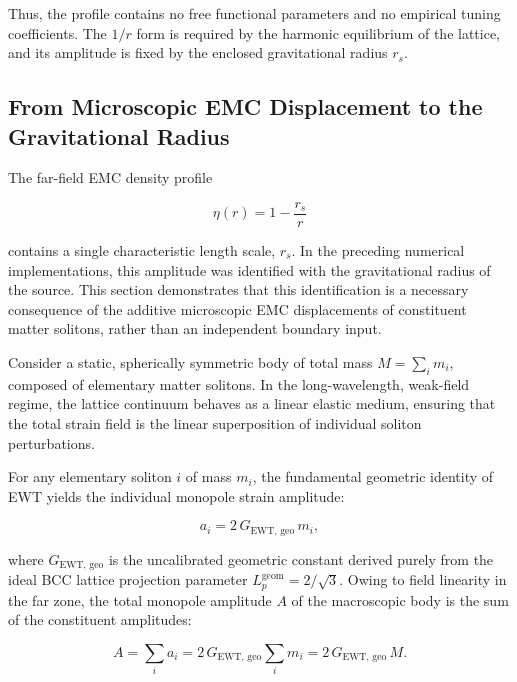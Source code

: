 \documentclass[10pt,a4paper]{article}
\begin{document}
Thus, the profile contains no free functional parameters and no empirical
tuning coefficients. The \(1/r\) form is required by the harmonic
equilibrium of the lattice, and its amplitude is fixed by the enclosed
gravitational radius \(r_s\).

\subsection{From Microscopic EMC Displacement to the Gravitational Radius}
\label{sec:micro_to_gravitational_radius}

The far-field EMC density profile

\begin{equation}
	\eta(r) = 1 - \frac{r_s}{r}
\end{equation}

contains a single characteristic length scale, \(r_s\). In the preceding numerical implementations, this amplitude was identified with the gravitational radius of the source. This section demonstrates that this identification is a necessary consequence of the additive microscopic EMC displacements of constituent matter solitons, rather than an independent boundary input.

Consider a static, spherically symmetric body of total mass \(M = \sum_i m_i\), composed of elementary matter solitons. In the long-wavelength, weak-field regime, the lattice continuum behaves as a linear elastic medium, ensuring that the total strain field is the linear superposition of individual soliton perturbations.

For any elementary soliton \(i\) of mass \(m_i\), the fundamental geometric identity of EWT yields the individual monopole strain amplitude:

\begin{equation}
	a_i = 2\,G_{\text{EWT, geo}}\,m_i ,
\end{equation}

where \(G_{\text{EWT, geo}}\) is the uncalibrated geometric constant derived purely from the ideal BCC lattice projection parameter \(L_p^{\text{geom}} = 2/\sqrt{3}\). Owing to field linearity in the far zone, the total monopole amplitude \(A\) of the macroscopic body is the sum of the constituent amplitudes:

\begin{equation}
	A = \sum_i a_i = 2\,G_{\text{EWT, geo}} \sum_i m_i = 2\,G_{\text{EWT, geo}}\,M .
	\label{eq:additive_monopole}
\end{equation}
\end{document}
